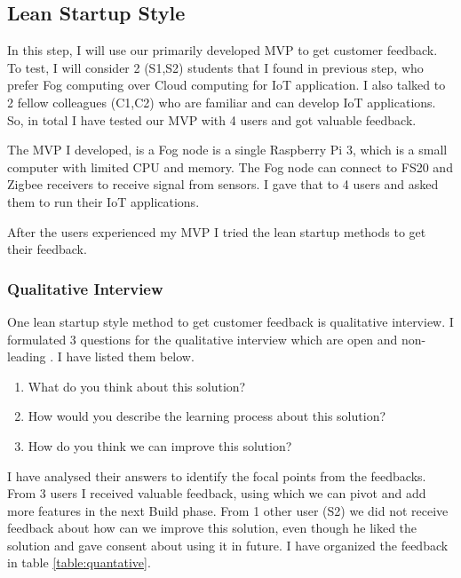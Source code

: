 
\subsection{Lean Startup Style}

In this step, I will use our primarily developed \ac{MVP} to get customer feedback. To test, I will consider 2 (S1,S2) students that I found in previous step, who prefer Fog computing over Cloud computing for \ac{IoT} application. I also talked to 2 fellow colleagues (C1,C2) who are familiar and can develop \ac{IoT} applications. So, in total I have tested our \ac{MVP} with 4 users and got valuable feedback.

The \ac{MVP} I developed, is a Fog node is a single Raspberry Pi 3, which is a small computer with limited CPU and memory. The Fog node can connect to FS20 and Zigbee receivers to receive signal from sensors. I gave that to 4 users and asked them to run their \ac{IoT} applications. 


After the users experienced my \ac{MVP} I tried the lean startup methods to get their feedback. 

\subsubsection{Qualitative Interview}
One lean startup style method to get customer feedback is qualitative interview. I formulated 3 questions for the qualitative interview which are open and non-leading \citep{qualitativeinterview}. I have listed them below.

\begin{enumerate}
\item What do you think about this solution?
\item How would you describe the learning process about this solution?
\item How do you think we can improve this solution?
\end{enumerate}

I have analysed their answers to identify the focal points from the feedbacks. From 3 users I received valuable feedback, using which we can pivot and add more features in the next Build phase. From 1 other user (S2) we did not receive feedback about how can we improve this solution, even though he liked the solution and gave consent about using it in future. I have organized the feedback in table \ref{table:quantative}. 

